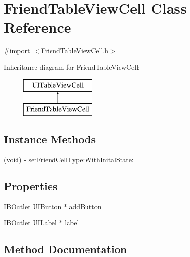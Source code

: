 \hypertarget{interface_friend_table_view_cell}{}\section{Friend\+Table\+View\+Cell Class Reference}
\label{interface_friend_table_view_cell}


{\ttfamily \#import $<$Friend\+Table\+View\+Cell.\+h$>$}

Inheritance diagram for Friend\+Table\+View\+Cell\+:\begin{figure}[H]
\begin{center}
\leavevmode
\includegraphics[height=2.000000cm]{interface_friend_table_view_cell}
\end{center}
\end{figure}
\subsection*{Instance Methods}
\begin{DoxyCompactItemize}
\item 
(void) -\/ \hyperlink{interface_friend_table_view_cell_ad03dfa875fae5116b5c537025d108355}{set\+Friend\+Cell\+Type\+:\+With\+Inital\+State\+:}
\end{DoxyCompactItemize}
\subsection*{Properties}
\begin{DoxyCompactItemize}
\item 
I\+B\+Outlet U\+I\+Button $\ast$ \hyperlink{interface_friend_table_view_cell_a1320a6103138b9ea5240e30caa97eb32}{add\+Button}
\item 
I\+B\+Outlet U\+I\+Label $\ast$ \hyperlink{interface_friend_table_view_cell_ac6db166c2169fda84494a2689dd1955e}{label}
\end{DoxyCompactItemize}


\subsection{Method Documentation}
\hypertarget{interface_friend_table_view_cell_ad03dfa875fae5116b5c537025d108355}{}\label{interface_friend_table_view_cell_ad03dfa875fae5116b5c537025d108355} 
